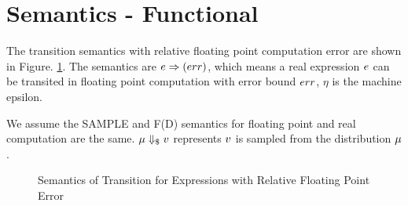 \documentclass[a4paper,11pt]{article}
\begin{document}
\newpage
\section{Semantics - Functional}

The transition semantics with relative floating point computation error are shown in Figure. \ref{fig_func_trans_semantics_exp}. The semantics are $e \Rightarrow (err)$, which means a real expression $e$ can be transited in floating point computation with error bound $err$, $\eta$ is the machine epsilon.

We assume the SAMPLE and F(D) semantics for floating point and real computation are the same. $\mu \Downarrow_{\$} v$ represents $v$ is sampled from the distribution $\mu$.

\begin{figure}
\caption{Semantics of Transition for Expressions with Relative Floating Point Error}
\label{fig_func_trans_semantics_exp}
\end{figure}
\end{document}
